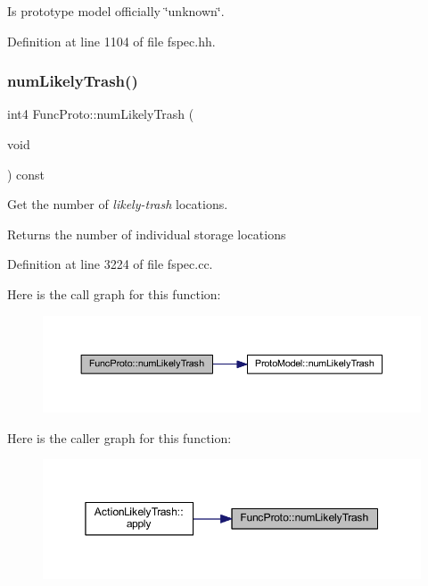 Is prototype model officially \char`\"{}unknown\char`\"{}. 



Definition at line 1104 of file fspec.\+hh.

\mbox{\label{class_func_proto_af903eb699778675e96f0d3376b505732}} 
\subsubsection{\texorpdfstring{numLikelyTrash()}{numLikelyTrash()}}
{\footnotesize\ttfamily int4 Func\+Proto\+::num\+Likely\+Trash (\begin{DoxyParamCaption}\item[{void}]{ }\end{DoxyParamCaption}) const}



Get the number of {\itshape likely-\/trash} locations. 

\begin{DoxyReturn}{Returns}
the number of individual storage locations 
\end{DoxyReturn}


Definition at line 3224 of file fspec.\+cc.

Here is the call graph for this function\+:
\nopagebreak
\begin{figure}[H]
\begin{center}
\leavevmode
\includegraphics[width=350pt]{class_func_proto_af903eb699778675e96f0d3376b505732_cgraph}
\end{center}
\end{figure}
Here is the caller graph for this function\+:
\nopagebreak
\begin{figure}[H]
\begin{center}
\leavevmode
\includegraphics[width=350pt]{class_func_proto_af903eb699778675e96f0d3376b505732_icgraph}
\end{center}
\end{figure}
\mbox{\label{class_func_proto_a8151d0b73aa51650515ba3f26e73e903}} 
